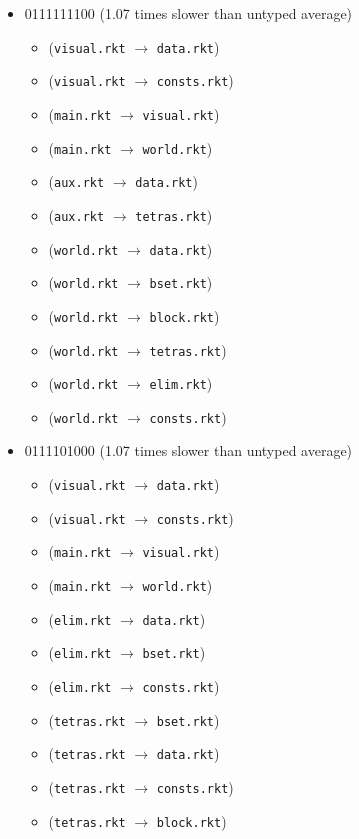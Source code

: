 \documentclass{article}
\newcommand{\mono}[1]{\texttt{#1}}
\begin{document}
\begin{itemize}
\item 0111111100 (1.07 times slower than untyped average)
  \begin{itemize}
  \item (\mono{visual.rkt} $\rightarrow$ \mono{data.rkt})
  \item (\mono{visual.rkt} $\rightarrow$ \mono{consts.rkt})
  \item (\mono{main.rkt} $\rightarrow$ \mono{visual.rkt})
  \item (\mono{main.rkt} $\rightarrow$ \mono{world.rkt})
  \item (\mono{aux.rkt} $\rightarrow$ \mono{data.rkt})
  \item (\mono{aux.rkt} $\rightarrow$ \mono{tetras.rkt})
  \item (\mono{world.rkt} $\rightarrow$ \mono{data.rkt})
  \item (\mono{world.rkt} $\rightarrow$ \mono{bset.rkt})
  \item (\mono{world.rkt} $\rightarrow$ \mono{block.rkt})
  \item (\mono{world.rkt} $\rightarrow$ \mono{tetras.rkt})
  \item (\mono{world.rkt} $\rightarrow$ \mono{elim.rkt})
  \item (\mono{world.rkt} $\rightarrow$ \mono{consts.rkt})
  \end{itemize}
\item 0111101000 (1.07 times slower than untyped average)
  \begin{itemize}
  \item (\mono{visual.rkt} $\rightarrow$ \mono{data.rkt})
  \item (\mono{visual.rkt} $\rightarrow$ \mono{consts.rkt})
  \item (\mono{main.rkt} $\rightarrow$ \mono{visual.rkt})
  \item (\mono{main.rkt} $\rightarrow$ \mono{world.rkt})
  \item (\mono{elim.rkt} $\rightarrow$ \mono{data.rkt})
  \item (\mono{elim.rkt} $\rightarrow$ \mono{bset.rkt})
  \item (\mono{elim.rkt} $\rightarrow$ \mono{consts.rkt})
  \item (\mono{tetras.rkt} $\rightarrow$ \mono{bset.rkt})
  \item (\mono{tetras.rkt} $\rightarrow$ \mono{data.rkt})
  \item (\mono{tetras.rkt} $\rightarrow$ \mono{consts.rkt})
  \item (\mono{tetras.rkt} $\rightarrow$ \mono{block.rkt})

\end{itemize}
\end{itemize}
\end{document}

